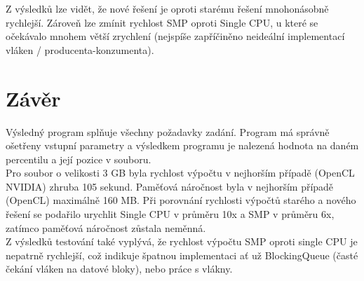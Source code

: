 \documentclass[12pt, a4paper]{article}
\begin{document}
\noindent Z výsledků lze vidět, že nové řešení je oproti starému řešení mnohonásobně rychlejší. Zároveň lze zmínit rychlost SMP oproti Single CPU, u které se očekávalo mnohem větší zrychlení (nejspíše zapříčiněno neideální implementací vláken / producenta-konzumenta).

\newpage

\section{Závěr}
Výsledný program splňuje všechny požadavky zadání. Program má správně ošetřeny vstupní parametry a výsledkem programu je nalezená hodnota na daném percentilu a její pozice v souboru.\\
\indent Pro soubor o velikosti 3 GB byla rychlost výpočtu v nejhorším případě (OpenCL NVIDIA) zhruba 105 sekund. Paměťová náročnost byla v nejhorším případě (OpenCL) maximálně 160 MB. Při porovnání rychlosti výpočtů starého a nového řešení se podařilo urychlit Single CPU v průměru 10x a SMP v průměru 6x, zatímco paměťová náročnost zůstala neměnná. \\
\indent Z výsledků testování také vyplývá, že rychlost výpočtu SMP oproti single CPU je nepatrně rychlejší, což indikuje špatnou implementaci ať už BlockingQueue (časté čekání vláken na datové bloky), nebo práce s vlákny.
\newpage
	
\end{document}
